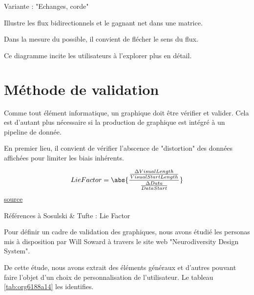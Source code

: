 \documentclass[a4paper,12pt]{article}
\begin{document}
\begin{multicols}{2}
Variante : "Echanges, corde"

Illustre les flux bidirectionnels et le gagnant net dans une matrice. \autocite{alansmithLexiqueVisuel}

Dans la mesure du possible, il convient de flécher le sens du flux.

Ce diagramme incite les utilisateurs à l'explorer plus en détail. \autocite{jonathanschwabishRelationship2021}
\section{Méthode de validation}
\label{sec:orgbfe8227}
Comme tout élément informatique, un graphique doit être vérifier et valider. Cela est d'autant plus nécessaire si la production de graphique est intégré à un pipeline de donnée.

En premier lieu, il convient de vérifier l'abscence de "distortion" des données affichées pour limiter les biais inhérents.\autocite{stephenfewGeneralGraphDesign2012}

$$LieFactor=\abs{\frac{\frac{\Delta VisualLength}{VisualStartLength}}{\frac{\Delta Data}{DataStart}}}$$
\href{https://www.labo.mathieurella.fr/?p=395}{source}

Références à Sosulski \& Tufte : Lie Factor

Pour définir un cadre de validation des graphiques, nous avons étudié les personas mis à disposition par Will Soward à travers le site web "Neurodiversity Design System".\autocite{NeurodiversityDesignSystem}

De cette étude, nous avons extrait des éléments généraux et d'autres pouvant faire l'objet d'un choix de personnalisation de l'utilisateur. Le tableau \ref{tab:org6188a14} les identifies.


\end{multicols}
\end{document}
